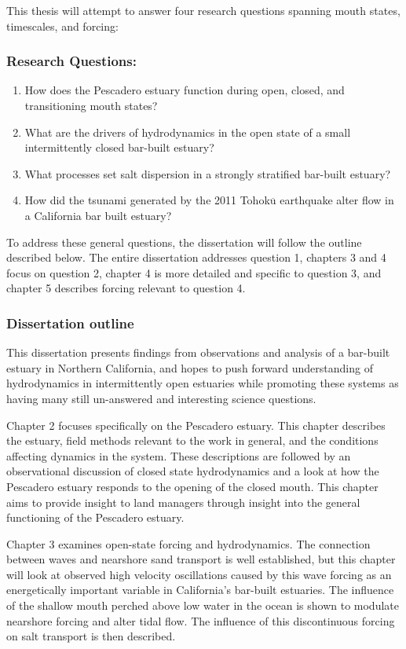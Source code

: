 This thesis will attempt to answer four research questions spanning mouth states, timescales, and forcing: 


\subsubsection{Research Questions:}
\begin{enumerate}
	\item{How does the Pescadero estuary function during open, closed, and transitioning mouth states?}
	\item{What are the drivers of hydrodynamics in the open state of a small intermittently closed bar-built estuary?}
	\item{What processes set salt dispersion in a strongly stratified bar-built estuary?}
	\item{How did the tsunami generated by the 2011 Tohok$\overline{\mathrm{u}}$ earthquake alter flow in a California bar built estuary?}
\end{enumerate}

To address these general questions, the dissertation will follow the outline described below. The entire dissertation addresses question 1, chapters 3 and 4 focus on question 2, chapter 4 is more detailed and specific to question 3, and chapter 5 describes forcing relevant to question 4.

\subsubsection{Dissertation outline}

This dissertation presents findings from observations and analysis of a bar-built estuary in Northern California, and hopes to push forward understanding of hydrodynamics in intermittently open estuaries while promoting these systems as having many still un-answered and interesting science questions.

Chapter 2 focuses specifically on the Pescadero estuary. This chapter describes the estuary, field methods relevant to the work in general, and the conditions affecting dynamics in the system. These descriptions are followed by an observational discussion of closed state hydrodynamics and a look at how the Pescadero estuary responds to the opening of the closed mouth. This chapter aims to provide insight to land managers through insight into the general functioning of the Pescadero estuary.

Chapter 3 examines open-state forcing and hydrodynamics. The connection between waves and nearshore sand transport is well established, but this chapter will look at observed high velocity oscillations caused by this wave forcing as an energetically important variable in California's bar-built estuaries. The influence of the shallow mouth perched above low water in the ocean is shown to modulate nearshore forcing and alter tidal flow. The influence of this discontinuous forcing on salt transport is then described.

